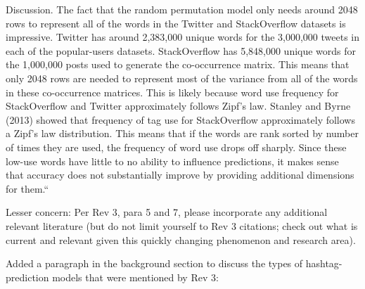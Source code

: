 \documentclass[answers,12pt]{exam}
\begin{document}
\begin{questions}
\begin{solution}
Discussion. The fact that the random permutation model only needs around 2048 rows to represent all of the words in the Twitter and StackOverflow datasets is impressive. Twitter has around 2,383,000 unique words for the 3,000,000 tweets in each of the popular-users datasets. StackOverflow has 5,848,000 unique words for the 1,000,000 posts used to generate the co-occurrence matrix. This means that only 2048 rows are needed to represent most of the variance from all of the words in these co-occurrence matrices. This is likely because word use frequency for StackOverflow and Twitter approximately follows Zipf’s law. Stanley and Byrne (2013) showed that frequency of tag use for StackOverflow approximately follows a Zipf’s law distribution. This means that if the words are rank sorted by number of times they are used, the frequency of word use drops off sharply. Since these low-use words have little to no ability to influence predictions, it makes sense that accuracy does not substantially improve by providing additional dimensions for them.``

\end{solution}

\question Lesser concern: Per Rev 3, para 5 and 7, please incorporate any additional relevant literature (but do not limit yourself to Rev 3 citations; check out what is current and relevant given this quickly changing phenomenon and research area).

\begin{solution}
Added a paragraph in the background section to discuss the types of hashtag-prediction models that were mentioned by Rev 3:


\end{solution}
\end{questions}
\end{document}
